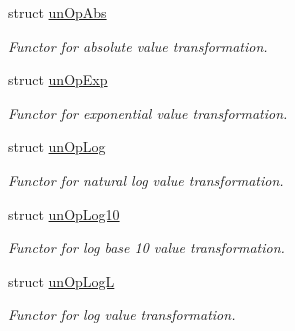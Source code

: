 \begin{DoxyCompactItemize}
struct \hyperlink{structmerlin_1_1factor_1_1unOpAbs}{un\+Op\+Abs}
\begin{DoxyCompactList}\small\item\em Functor for absolute value transformation. \end{DoxyCompactList}\item 
struct \hyperlink{structmerlin_1_1factor_1_1unOpExp}{un\+Op\+Exp}
\begin{DoxyCompactList}\small\item\em Functor for exponential value transformation. \end{DoxyCompactList}\item 
struct \hyperlink{structmerlin_1_1factor_1_1unOpLog}{un\+Op\+Log}
\begin{DoxyCompactList}\small\item\em Functor for natural log value transformation. \end{DoxyCompactList}\item 
struct \hyperlink{structmerlin_1_1factor_1_1unOpLog10}{un\+Op\+Log10}
\begin{DoxyCompactList}\small\item\em Functor for log base 10 value transformation. \end{DoxyCompactList}\item 
struct \hyperlink{structmerlin_1_1factor_1_1unOpLogL}{un\+Op\+Log\+L}
\begin{DoxyCompactList}\small\item\em Functor for log value transformation. \end{DoxyCompactList}\end{DoxyCompactItemize}
